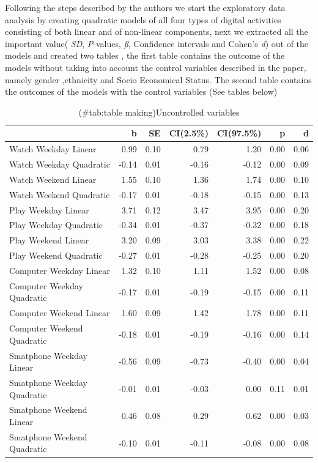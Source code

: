 \documentclass[floatsintext,man]{apa6}
\theoremstyle{definition}
\theoremstyle{definition}
\theoremstyle{definition}
\theoremstyle{remark}
\begin{document}
Following the steps described by the authors we start the exploratory
data analysis by creating quadratic models of all four types of digital
activities consisting of both linear and of non-linear components, next
we extracted all the important value( \emph{SD}, \emph{P}-values,
\emph{ß}, Confidence intervals and Cohen's \emph{d}) out of the models
and created two tables , the first table contains the outcome of the
models without taking into account the control variables described in
the paper, namely gender ,ethnicity and Socio Economical Status. The
second table contains the outcomes of the models with the control
variables (See tables below)

\begin{table}

\caption{(\#tab:table making)Uncontrolled variables}
\centering
\begin{tabular}[t]{l|r|r|r|r|r|r}
\hline
  & b & SE & CI(2.5\%) & CI(97.5\%) & p & d\\
\hline
Watch Weekday Linear & 0.99 & 0.10 & 0.79 & 1.20 & 0.00 & 0.06\\
\hline
Watch Weekday Quadratic & -0.14 & 0.01 & -0.16 & -0.12 & 0.00 & 0.09\\
\hline
Watch Weekend Linear & 1.55 & 0.10 & 1.36 & 1.74 & 0.00 & 0.10\\
\hline
Watch Weekend Quadratic & -0.17 & 0.01 & -0.18 & -0.15 & 0.00 & 0.13\\
\hline
Play Weekday Linear & 3.71 & 0.12 & 3.47 & 3.95 & 0.00 & 0.20\\
\hline
Play Weekday Quadratic & -0.34 & 0.01 & -0.37 & -0.32 & 0.00 & 0.18\\
\hline
Play Weekend Linear & 3.20 & 0.09 & 3.03 & 3.38 & 0.00 & 0.22\\
\hline
Play Weekend Quadratic & -0.27 & 0.01 & -0.28 & -0.25 & 0.00 & 0.20\\
\hline
Computer Weekday Linear & 1.32 & 0.10 & 1.11 & 1.52 & 0.00 & 0.08\\
\hline
Computer Weekday Quadratic & -0.17 & 0.01 & -0.19 & -0.15 & 0.00 & 0.11\\
\hline
Computer Weekend Linear & 1.60 & 0.09 & 1.42 & 1.78 & 0.00 & 0.11\\
\hline
Computer Weekend Quadratic & -0.18 & 0.01 & -0.19 & -0.16 & 0.00 & 0.14\\
\hline
Smatphone Weekday Linear & -0.56 & 0.09 & -0.73 & -0.40 & 0.00 & 0.04\\
\hline
Smatphone Weekday Quadratic & -0.01 & 0.01 & -0.03 & 0.00 & 0.11 & 0.01\\
\hline
Smatphone Weekend Linear & 0.46 & 0.08 & 0.29 & 0.62 & 0.00 & 0.03\\
\hline
Smatphone Weekend Quadratic & -0.10 & 0.01 & -0.11 & -0.08 & 0.00 & 0.08\\
\hline
\end{tabular}
\end{table}
\end{document}

